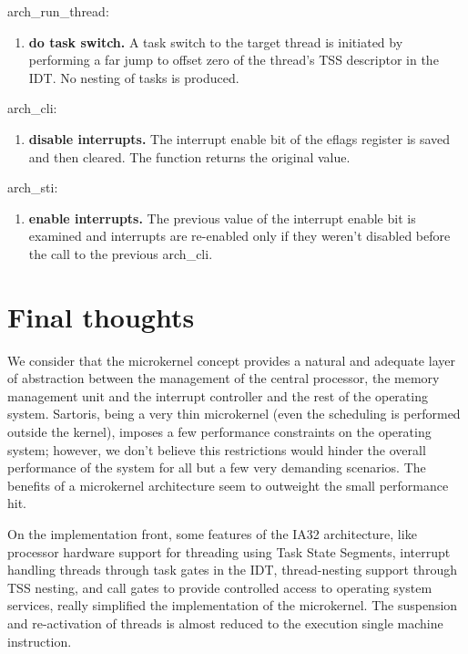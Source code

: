 \documentclass[11pt, letterpaper, twoside, english]{book}
\begin{document}
\textsf{arch\_run\_thread}: 
\begin{enumerate}
\item[]\textbf{do task switch.} A task switch to the target thread is initiated by performing a far jump to offset zero of the thread's TSS descriptor in the IDT. No nesting of tasks is produced.
\end{enumerate}

\textsf{arch\_cli}:
\begin{enumerate}
\item[]\textbf{disable interrupts.} The interrupt enable bit of the eflags register is saved and then cleared. The function returns the original value.
\end{enumerate}

\textsf{arch\_sti}:
\begin{enumerate}
\item[]\textbf{enable interrupts.} The previous value of the interrupt enable bit is examined and interrupts are re-enabled only if they weren't disabled before the call to the previous \textsf{arch\_cli}.
\end{enumerate}

\chapter{Final thoughts}

We consider that the microkernel concept provides a natural and adequate layer of abstraction between the management of the central processor, the memory management unit and the interrupt controller and the rest of the operating system. Sartoris, being  a very thin microkernel (even the scheduling is performed outside the kernel), imposes a few performance constraints on the operating system; however, we don't believe this restrictions would hinder the overall performance of the system for all but a few very demanding scenarios. The benefits of a microkernel architecture seem to outweight the small performance hit.

On the implementation front, some features of the IA32 architecture, like processor hardware support for threading using Task State Segments, interrupt handling threads through task gates in the IDT, thread-nesting support through TSS nesting, and call gates to provide controlled access to operating system services, really simplified the implementation of the microkernel. The suspension and re-activation of threads is almost reduced to the execution single machine instruction.
\end{document}

